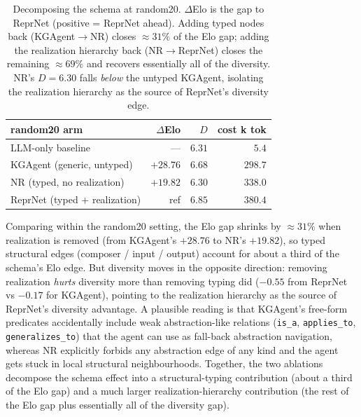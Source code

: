 \documentclass[10pt,twocolumn]{article}
\begin{document}
\begin{table}[t]
\centering
\footnotesize
\setlength{\tabcolsep}{4pt}
\begin{tabular}{lrrr}
\toprule
random20 arm                  & $\Delta$Elo & $D$    & cost k tok \\
\midrule
LLM-only baseline               & ---         & $6.31$ & $5.4$      \\
KGAgent (generic, untyped)    & $+28.76$    & $6.68$ & $298.7$    \\
NR (typed, no realization)    & $+19.82$    & $6.30$ & $338.0$    \\
ReprNet (typed + realization) & ref         & $6.85$ & $380.4$    \\
\bottomrule
\end{tabular}
\caption{Decomposing the schema at random20.  $\Delta$Elo is the
gap to ReprNet (positive = ReprNet ahead).  Adding typed nodes back
(KGAgent$\to$NR) closes $\approx 31\%$ of the Elo gap; adding the
realization hierarchy back (NR$\to$ReprNet) closes the remaining
$\approx 69\%$ and recovers essentially all of the diversity.  NR's
$D=6.30$ falls \emph{below} the untyped KGAgent, isolating the
realization hierarchy as the source of ReprNet's diversity edge.}
\label{tab:nr-decomp}
\end{table}  Comparing within
the random20 setting, the Elo gap shrinks by $\approx 31\%$ when
realization is removed (from KGAgent's $+28.76$ to NR's $+19.82$),
so typed structural edges (composer / input / output) account for
about a third of the schema's Elo edge.  But diversity moves in the
opposite direction: removing realization \emph{hurts} diversity
more than removing typing did ($-0.55$ from ReprNet vs $-0.17$ for
KGAgent), pointing to the realization hierarchy as the source of
ReprNet's diversity advantage.  A plausible reading is that
KGAgent's free-form predicates accidentally include weak
abstraction-like relations (\texttt{is\_a}, \texttt{applies\_to},
\texttt{generalizes\_to}) that the agent can use as fall-back
abstraction navigation, whereas NR explicitly forbids any
abstraction edge of any kind and the agent gets stuck in local
structural neighbourhoods.  Together, the two ablations decompose
the schema effect into a structural-typing contribution (about a
third of the Elo gap) and a much larger realization-hierarchy
contribution (the rest of the Elo gap plus essentially all of the
diversity gap).
\end{document}
